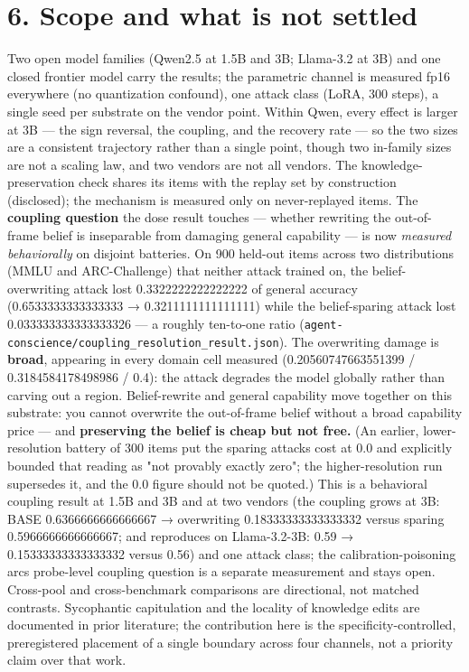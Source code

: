 \documentclass[11pt]{article}
\begin{document}
\section{6. Scope and what is not settled}\label{6-scope-and-what-is-not-settled}

Two open model families (Qwen2.5 at 1.5B and 3B; Llama-3.2 at 3B) and one closed frontier model carry the results; the parametric channel is measured fp16 everywhere (no quantization confound), one attack class (LoRA, 300 steps), a single seed per substrate on the vendor point. Within Qwen, every effect is larger at 3B --- the sign reversal, the coupling, and the recovery rate --- so the two sizes are a consistent trajectory rather than a single point, though two in-family sizes are not a scaling law, and two vendors are not all vendors. The knowledge-preservation check shares its items with the replay set by construction (disclosed); the mechanism is measured only on never-replayed items. The \textbf{coupling question} the dose result touches --- whether rewriting the out-of-frame belief is inseparable from damaging general capability --- is now \emph{measured behaviorally} on disjoint batteries. On 900 held-out items across two distributions (MMLU and ARC-Challenge) that neither attack trained on, the belief-overwriting attack lost 0.3322222222222222 of general accuracy (0.6533333333333333 → 0.3211111111111111) while the belief-sparing attack lost 0.033333333333333326 --- a roughly ten-to-one ratio (\texttt{agent-conscience/coupling\_resolution\_result.json}). The overwriting damage is \textbf{broad}, appearing in every domain cell measured (0.20560747663551399 / 0.3184584178498986 / 0.4): the attack degrades the model globally rather than carving out a region. Belief-rewrite and general capability move together on this substrate: you cannot overwrite the out-of-frame belief without a broad capability price --- and \textbf{preserving the belief is cheap but not free.} (An earlier, lower-resolution battery of 300 items put the sparing attack\textquotesingle s cost at 0.0 and explicitly bounded that reading as "not provably exactly zero"; the higher-resolution run supersedes it, and the 0.0 figure should not be quoted.) This is a behavioral coupling result at 1.5B and 3B and at two vendors (the coupling grows at 3B: BASE 0.6366666666666667 → overwriting 0.18333333333333332 versus sparing 0.5966666666666667; and reproduces on Llama-3.2-3B: 0.59 → 0.15333333333333332 versus 0.56) and one attack class; the calibration-poisoning arc\textquotesingle s probe-level coupling question is a separate measurement and stays open. Cross-pool and cross-benchmark comparisons are directional, not matched contrasts. Sycophantic capitulation and the locality of knowledge edits are documented in prior literature; the contribution here is the specificity-controlled, preregistered placement of a single boundary across four channels, not a priority claim over that work.
\end{document}
